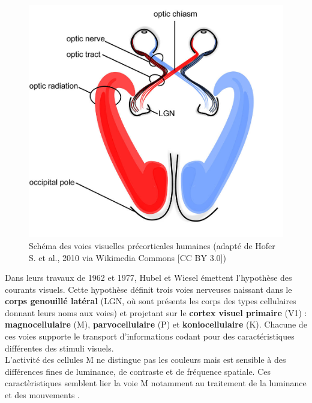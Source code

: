 \begin{figure}[th]
\centering
\includegraphics{Figures/visual_system}
\decoRule %
\caption[Figure]{Schéma des voies visuelles précorticales humaines (adapté de Hofer S. et al., 2010 via Wikimedia Commons [CC BY 3.0])}
\label{fig:visual_system}
\end{figure}

Dans leurs travaux de 1962 et 1977, Hubel et Wiesel émettent l'hypothèse des courants visuels. Cette hypothèse définit trois voies nerveuses naissant dans le \textbf{corps genouillé latéral} (LGN, où sont présents les corps des types cellulaires donnant leurs noms aux voies) et projetant sur le \textbf{cortex visuel primaire} (V1) :  \textbf{magnocellulaire} (M),  \textbf{parvocellulaire} (P) et  \textbf{koniocellulaire} (K). Chacune de ces voies supporte le transport d'informations codant pour des caractéristiques différentes des stimuli visuels.\\
L'activité des cellules M ne distingue pas les couleurs mais est sensible à des différences fines de luminance, de contraste et de fréquence spatiale. Ces caractèristiques semblent lier la voie M notamment au traitement de la luminance et des mouvements \autocite{Werner2014}.

